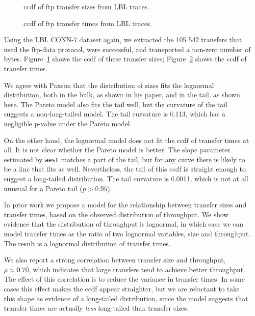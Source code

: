 \documentclass{elsart}
\begin{document}
\begin{figure}[tb]
\centerline{}
\caption{ccdf of ftp transfer sizes from LBL traces.}
\label{fig.tcp.sizes}
\end{figure}

\begin{figure}[tb]
\centerline{}
\caption{ccdf of ftp transfer times from LBL traces.}
\label{fig.tcp.times}
\end{figure}

Using the LBL CONN-7 dataset again, we extracted the 105 542 transfers
that used the ftp-data protocol, were successful, and transported a
non-zero number of bytes.  Figure~\ref{fig.tcp.sizes} shows the ccdf
of these transfer sizes; Figure~\ref{fig.tcp.times} shows the ccdf of
transfer times.

We agree with Paxson that the distribution of sizes fits the lognormal
distribution, both in the bulk, as shown in his paper,
and in the tail, as shown here.  The Pareto model also fits the tail
well, but the curvature of the tail suggests a non-long-tailed model.
The tail curvature is 0.113, which has a negligible p-value under the
Pareto model.

On the other hand, the lognormal model does not fit the ccdf of
transfer times at all.  It is not clear whether the Pareto model is
better.  The slope parameter estimated by \texttt{aest} matches a part
of the tail, but for any curve there is likely to be a line that fits
as well.  Nevertheless, the tail of this ccdf is straight enough to
suggest a long-tailed distribution.  The tail curvature is 0.0011,
which is not at all unusual for a Pareto tail ($p > 0.95$).

In prior work \cite{Downey01Evidence} we propose a model for the
relationship between transfer sizes and transfer times, based on the
observed distribution of throughput.  We show evidence that the
distribution of throughput is lognormal, in which case we can model
transfer times as the ratio of two lognormal variables, size and
throughput.  The result is a lognormal distribution of transfer times.

We also report a strong correlation between transfer size and
throughput, $\rho \approx 0.70$, which indicates that large transfers
tend to achieve better throughput.  The effect of this correlation
is to reduce the variance in transfer times.  In some cases this
effect makes the ccdf appear straighter, but we are reluctant to take
this shape as evidence of a long-tailed distribution, since the model
suggests that transfer times are actually {\em less} long-tailed than
transfer sizes.
\end{document}
